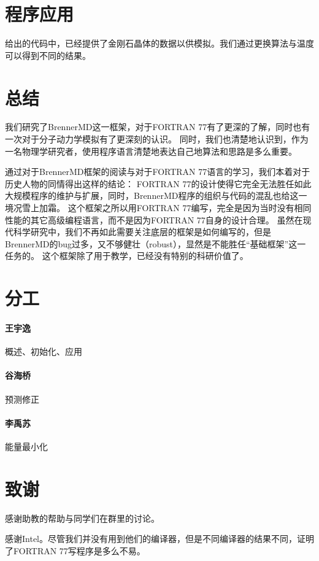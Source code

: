 \documentclass[UTF-8]{ctexart}
\begin{document}
\section{程序应用}
给出的代码中，已经提供了金刚石晶体的数据以供模拟。我们通过更换算法与温度可以得到不同的结果。

\section{总结}
我们研究了BrennerMD这一框架，对于FORTRAN 77有了更深的了解，同时也有一次对于分子动力学模拟有了更深刻的认识。
同时，我们也清楚地认识到，作为一名物理学研究者，使用程序语言清楚地表达自己地算法和思路是多么重要。

通过对于BrennerMD框架的阅读与对于FORTRAN 77语言的学习，我们本着对于历史人物的同情得出这样的结论：
FORTRAN 77的设计使得它完全无法胜任如此大规模程序的维护与扩展，同时，BrennerMD程序的组织与代码的混乱也给这一境况雪上加霜。
这个框架之所以用FORTRAN 77编写，完全是因为当时没有相同性能的其它高级编程语言，而不是因为FORTRAN 77自身的设计合理。
虽然在现代科学研究中，我们不再如此需要关注底层的框架是如何编写的，但是BrennerMD的bug过多，又不够健壮（robust），显然是不能胜任“基础框架”这一任务的。
这个框架除了用于教学，已经没有特别的科研价值了。

\section{分工}
\paragraph{王宇逸}概述、初始化、应用
\paragraph{谷海桥}预测修正
\paragraph{李禹苏}能量最小化

\section{致谢}
感谢助教的帮助与同学们在群里的讨论。

感谢Intel。尽管我们并没有用到他们的编译器，但是不同编译器的结果不同，证明了FORTRAN 77写程序是多么不易。
\end{document}
